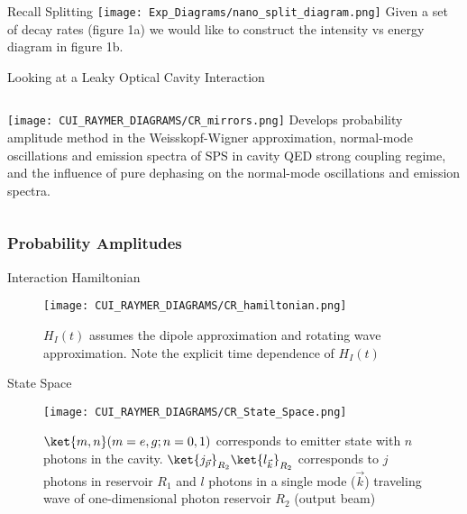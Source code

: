 \begin{frame}{Recall Splitting}
    \texttt{[image: Exp\_Diagrams/nano\_split\_diagram.png]}
\newline 
Given a set of decay rates (figure 1a) we would like to construct the intensity vs energy diagram in figure 1b.
\end{frame}


\begin{frame}{Looking at a Leaky Optical Cavity Interaction}
    \begin{columns}
        \texttt{[image: CUI\_RAYMER\_DIAGRAMS/CR\_mirrors.png]}
        \citep{Cui2006} Develops probability amplitude method in the Weisskopf-Wigner approximation, normal-mode oscillations and emission spectra of SPS in cavity QED strong coupling regime, and the influence of pure dephasing on the normal-mode oscillations and emission spectra. 
    \end{columns}
    
\end{frame}

\subsubsection{Probability Amplitudes}

\begin{frame}{Interaction Hamiltonian}
    \begin{figure}
        \centering
        \texttt{[image: CUI\_RAYMER\_DIAGRAMS/CR\_hamiltonian.png]}
        \caption{$H_I(t)$ assumes the dipole approximation and rotating wave approximation. Note the explicit time dependence of $H_I(t)$ }
        \label{fig:CR_Hamiltonian}
    \end{figure}

\end{frame}

\begin{frame}{State Space}
    \begin{figure}
        \centering
        \texttt{[image: CUI\_RAYMER\_DIAGRAMS/CR\_State\_Space.png]}
        \caption{ $\ket{m,n} (m=e,g;n=0,1)$ corresponds to emitter state with $n$ photons in the cavity.  $\ket{j_{\vec{p} }}_{R_2} \ket{l_{\vec{k}}}_{R_2}$ corresponds to $j$ photons in reservoir $R_1$ and $l$ photons in a single mode ($\vec{k}$) traveling wave of one-dimensional photon reservoir $R_2$ (output beam)}
        \label{fig:my_label}
    \end{figure}
\end{frame}


